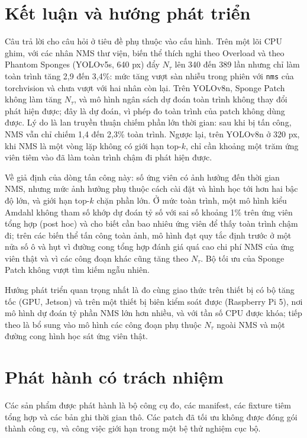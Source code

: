 \documentclass[12pt,a4paper]{article}
\newcommand{\Ntau}{N_{\tau}}
\begin{document}
\section{Kết luận và hướng phát triển}
\label{sec:conclusion}
Câu trả lời cho câu hỏi ở tiêu đề phụ thuộc vào cấu hình. Trên một lõi CPU ghim, với các nhân NMS thư viện, biến thể thích nghi theo Overload và theo Phantom Sponges (YOLOv5s, 640 px) đẩy $\Ntau$ lên 340 đến 389 lần nhưng chỉ làm toàn trình tăng 2,9 đến 3,4\%: mức tăng vượt sàn nhiễu trong phiên với \texttt{nms} của torchvision và chưa vượt với hai nhân còn lại. Trên YOLOv8n, Sponge Patch không làm tăng $\Ntau$, và mô hình ngân sách dự đoán toàn trình không thay đổi phát hiện được; đây là dự đoán, vì phép đo toàn trình của patch không dùng được. Lý do là lan truyền thuận chiếm phần lớn thời gian: sau khi bị tấn công, NMS vẫn chỉ chiếm 1,4 đến 2,3\% toàn trình. Ngược lại, trên YOLOv8n ở 320 px, khi NMS là một vòng lặp không có giới hạn top-$k$, chỉ cần khoảng một trăm ứng viên tiêm vào đã làm toàn trình chậm đi phát hiện được.

Về giả định của dòng tấn công này: số ứng viên có ảnh hưởng đến thời gian NMS, nhưng mức ảnh hưởng phụ thuộc cách cài đặt và hình học tới hơn hai bậc độ lớn, và giới hạn top-$k$ chặn phần lớn. Ở mức toàn trình, một mô hình kiểu Amdahl không tham số khớp dự đoán tỷ số với sai số khoảng 1\% trên ứng viên tổng hợp (post hoc) và cho biết cần bao nhiêu ứng viên để thấy toàn trình chậm đi; trên các biến thể tấn công toàn ảnh, mô hình đạt quy tắc định trước ở một nửa số ô và hụt vì đường cong tổng hợp đánh giá quá cao chi phí NMS của ứng viên thật và vì các công đoạn khác cũng tăng theo $\Ntau$. Bộ tối ưu của Sponge Patch không vượt tìm kiếm ngẫu nhiên.

Hướng phát triển quan trọng nhất là đo cùng giao thức trên thiết bị có bộ tăng tốc (GPU, Jetson) và trên một thiết bị biên kiểm soát được (Raspberry Pi 5), nơi mô hình dự đoán tỷ phần NMS lớn hơn nhiều, và với tần số CPU được khóa; tiếp theo là bổ sung vào mô hình các công đoạn phụ thuộc $\Ntau$ ngoài NMS và một đường cong hình học sát ứng viên thật.

\section*{Phát hành có trách nhiệm}
Các sản phẩm được phát hành là bộ công cụ đo, các manifest, các fixture tiêm tổng hợp và các bản ghi thời gian thô. Các patch đã tối ưu không được đóng gói thành công cụ, và công việc giới hạn trong một bệ thử nghiệm cục bộ.
\end{document}
